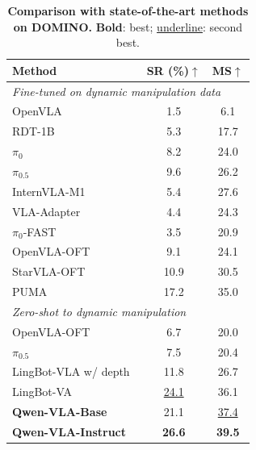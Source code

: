 \documentclass{llmxive}
\begin{document}
\begin{table}[t]
    \centering
    \small
    \setlength{\tabcolsep}{6pt}
    \begin{tabular}{lcc}
      \toprule
      \textbf{Method} & \textbf{SR (\%)$\uparrow$} & \textbf{MS$\uparrow$} \\
      \midrule
      \multicolumn{3}{l}{\textit{Fine-tuned on dynamic manipulation data}} \\
      \midrule
      OpenVLA~\citep{kim2024openvla} & 1.5  & 6.1 \\
      RDT-1B~\citep{liu2025rdt} & 5.3  & 17.7 \\
      $\pi_0$~\citep{black2024pi0} & 8.2  & 24.0 \\
      $\pi_{0.5}$~\citep{black2025pi05} & 9.6  & 26.2 \\
      InternVLA-M1~\citep{chen2025internvla} & 5.4  & 27.6 \\
      VLA-Adapter~\citep{wang2026vla} & 4.4  & 24.3 \\
      $\pi_0$-FAST~\citep{pertsch2025fast} & 3.5  & 20.9 \\
      OpenVLA-OFT~\citep{kim2025fine} & 9.1  & 24.1 \\
      StarVLA-OFT~\citep{community2026starvla} & 10.9 & 30.5 \\
      PUMA~\citep{fang2026towards} & 17.2 & 35.0 \\
      \midrule
      \multicolumn{3}{l}{\textit{Zero-shot to dynamic manipulation}} \\
      \midrule
      OpenVLA-OFT~\citep{kim2025fine} & 6.7  & 20.0 \\
      $\pi_{0.5}$~\citep{black2025pi05} & 7.5  & 20.4 \\
      LingBot-VLA w/ depth~\citep{wu2026pragmatic} & 11.8 & 26.7 \\
      LingBot-VA~\citep{li2026causal} & \underline{24.1} & 36.1 \\
      \midrule
      \textbf{Qwen-VLA-Base} & 21.1  & \underline{37.4} \\
      \textbf{Qwen-VLA-Instruct} &
      \textbf{26.6}    & \textbf{39.5} \\
      \bottomrule
    \end{tabular}
\caption{\textbf{Comparison with state-of-the-art methods on DOMINO.} \textbf{Bold}: best; \underline{underline}: second best.}
\label{tab:domino_ood}
\end{table}
\end{document}
